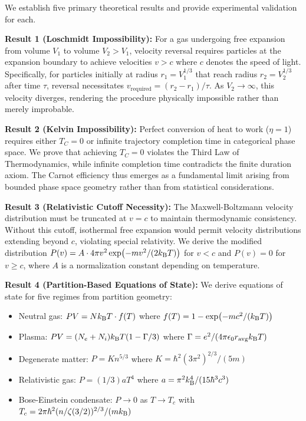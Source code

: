 We establish five primary theoretical results and provide experimental validation for each.

\textbf{Result 1 (Loschmidt Impossibility):} For a gas undergoing free expansion from volume $V_1$ to volume $V_2 > V_1$, velocity reversal requires particles at the expansion boundary to achieve velocities $v > c$ where $c$ denotes the speed of light. Specifically, for particles initially at radius $r_1 = V_1^{1/3}$ that reach radius $r_2 = V_2^{1/3}$ after time $\tau$, reversal necessitates $v_{\text{required}} = (r_2 - r_1)/\tau$. As $V_2 \to \infty$, this velocity diverges, rendering the procedure physically impossible rather than merely improbable.

\textbf{Result 2 (Kelvin Impossibility):} Perfect conversion of heat to work ($\eta = 1$) requires either $T_C = 0$ or infinite trajectory completion time in categorical phase space. We prove that achieving $T_C = 0$ violates the Third Law of Thermodynamics, while infinite completion time contradicts the finite duration axiom. The Carnot efficiency thus emerges as a fundamental limit arising from bounded phase space geometry rather than from statistical considerations.

\textbf{Result 3 (Relativistic Cutoff Necessity):} The Maxwell-Boltzmann velocity distribution must be truncated at $v = c$ to maintain thermodynamic consistency. Without this cutoff, isothermal free expansion would permit velocity distributions extending beyond $c$, violating special relativity. We derive the modified distribution $P(v) = A \cdot 4\pi v^2 \exp(-mv^2/(2k_{\mathrm{B}} T))$ for $v < c$ and $P(v) = 0$ for $v \geq c$, where $A$ is a normalization constant depending on temperature.

\textbf{Result 4 (Partition-Based Equations of State):} We derive equations of state for five regimes from partition geometry:
\begin{itemize}[noitemsep]
    \item Neutral gas: $PV = Nk_{\mathrm{B}} T \cdot f(T)$ where $f(T) = 1 - \exp(-mc^2/(k_{\mathrm{B}} T))$
    \item Plasma: $PV = (N_e + N_i)k_{\mathrm{B}} T(1 - \Gamma/3)$ where $\Gamma = e^2/(4\pi\epsilon_0 r_{\text{avg}} k_{\mathrm{B}} T)$
    \item Degenerate matter: $P = K n^{5/3}$ where $K = \hbar^2(3\pi^2)^{2/3}/(5m)$
    \item Relativistic gas: $P = (1/3)aT^4$ where $a = \pi^2k_{\mathrm{B}}^4/(15\hbar^3 c^3)$
    \item Bose-Einstein condensate: $P \to 0$ as $T \to T_c$ with $T_c = 2\pi\hbar^2(n/\zeta(3/2))^{2/3}/(mk_{\mathrm{B}})$
\end{itemize}

